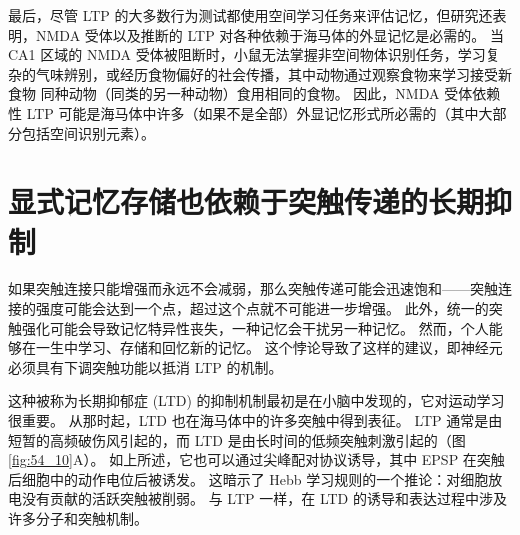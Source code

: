 最后，尽管 LTP 的大多数行为测试都使用空间学习任务来评估记忆，但研究还表明，NMDA 受体以及推断的 LTP 对各种依赖于海马体的外显记忆是必需的。
当 CA1 区域的 NMDA 受体被阻断时，小鼠无法掌握非空间物体识别任务，学习复杂的气味辨别，或经历食物偏好的社会传播，其中动物通过观察食物来学习接受新食物 同种动物（同类的另一种动物）食用相同的食物。
因此，NMDA 受体依赖性 LTP 可能是海马体中许多（如果不是全部）外显记忆形式所必需的（其中大部分包括空间识别元素）。



\section{显式记忆存储也依赖于突触传递的长期抑制}

如果突触连接只能增强而永远不会减弱，那么突触传递可能会迅速饱和——突触连接的强度可能会达到一个点，超过这个点就不可能进一步增强。
此外，统一的突触强化可能会导致记忆特异性丧失，一种记忆会干扰另一种记忆。
然而，个人能够在一生中学习、存储和回忆新的记忆。
这个悖论导致了这样的建议，即神经元必须具有下调突触功能以抵消 LTP 的机制。


这种被称为长期抑郁症 (LTD) 的抑制机制最初是在小脑中发现的，它对运动学习很重要。
从那时起，LTD 也在海马体中的许多突触中得到表征。 LTP 通常是由短暂的高频破伤风引起的，而 LTD 是由长时间的低频突触刺激引起的（图 \ref{fig:54_10}A）。
如上所述，它也可以通过尖峰配对协议诱导，其中 EPSP 在突触后细胞中的动作电位后被诱发。
这暗示了 Hebb 学习规则的一个推论：对细胞放电没有贡献的活跃突触被削弱。
与 LTP 一样，在 LTD 的诱导和表达过程中涉及许多分子和突触机制。


